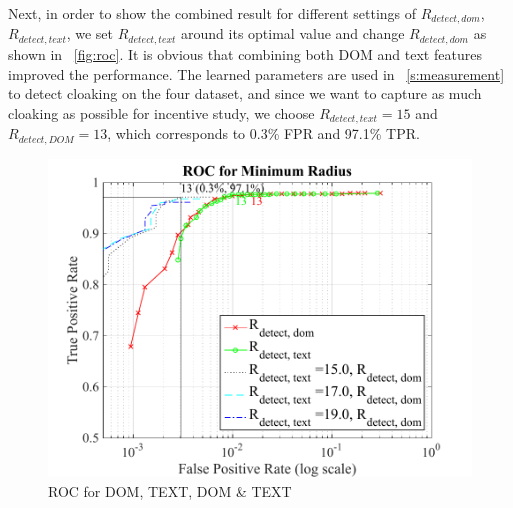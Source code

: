 Next, in order to show the combined result for different settings of $R_{detect,
dom}$, $R_{detect, text}$, we set $R_{detect, text}$ around its optimal value
and change $R_{detect, dom}$ as shown in ~\autoref{fig:roc}. It is obvious that
combining both DOM and text features improved the performance. 
The learned parameters are used in ~\autoref{s:measurement} to detect cloaking
on the four dataset, and since we want to capture as much cloaking as possible
for incentive study, we choose $R_{detect, text} = 15$ and $R_{detect, DOM} =
13$, which corresponds to 0.3\% FPR and 97.1\% TPR.

\begin{figure}[t]
  \centering
  \includegraphics[width=.5\textwidth]{fig/roc}
  \caption{ROC for DOM, TEXT, DOM \& TEXT}
  \label{fig:roc}
\end{figure}

